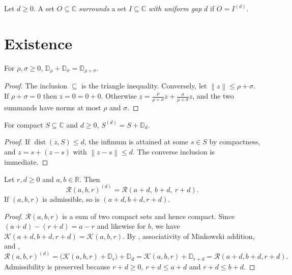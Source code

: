 \documentclass[a4paper,UKenglish,cleveref,autoref,thm-restate]{lipics-v2021}
\newcommand{\R}{\mathbb{R}}
\newcommand{\C}{\mathbb{C}}
\newcommand{\Disc}{\mathbb{D}}
\newcommand{\RR}{\mathcal{R}}
\newcommand{\Core}{\mathcal{K}}
\newcommand{\norm}[1]{\left\lVert #1 \right\rVert}
\DeclareMathOperator{\dist}{dist}
\begin{document}
\begin{definition}\label{def:gap}
Let $d \ge 0$. A set $O \subseteq \C$ \emph{surrounds} a set $I \subseteq \C$ \emph{with uniform
gap} $d$ if $O = I^{(d)}$.
\end{definition}

\section{Existence}\label{sec:existence}

\begin{lemma}\label{lem:disc}
For $\rho, \sigma \ge 0$, $\Disc_\rho + \Disc_\sigma = \Disc_{\rho + \sigma}$.
\end{lemma}

\begin{proof}
The inclusion $\subseteq$ is the triangle inequality. Conversely, let $\norm{z} \le \rho + \sigma$.
If $\rho + \sigma = 0$ then $z = 0 = 0 + 0$. Otherwise
$z = \frac{\rho}{\rho + \sigma} z + \frac{\sigma}{\rho + \sigma} z$, and the two summands have
norms at most $\rho$ and $\sigma$.
\end{proof}

\begin{lemma}\label{lem:compact}
For compact $S \subseteq \C$ and $d \ge 0$, $S^{(d)} = S + \Disc_d$.
\end{lemma}

\begin{proof}
If $\dist(z, S) \le d$, the infimum is attained at some $s \in S$ by compactness, and
$z = s + (z - s)$ with $\norm{z - s} \le d$. The converse inclusion is immediate.
\end{proof}

\begin{theorem}\label{thm:offset}
Let $r, d \ge 0$ and $a, b \in \R$. Then
\[
  \RR(a, b, r)^{(d)} = \RR(a + d,\ b + d,\ r + d).
\]
If $(a, b, r)$ is admissible, so is $(a + d, b + d, r + d)$.
\end{theorem}

\begin{proof}
$\RR(a, b, r)$ is a sum of two compact sets and hence compact. Since $(a + d) - (r + d) = a - r$
and likewise for $b$, we have $\Core(a + d, b + d, r + d) = \Core(a, b, r)$. By
, associativity of Minkowski addition, and ,
\[
  \RR(a, b, r)^{(d)}
  = \bigl(\Core(a, b, r) + \Disc_r\bigr) + \Disc_d
  = \Core(a, b, r) + \Disc_{r + d}
  = \RR(a + d, b + d, r + d).
\]
Admissibility is preserved because $r + d \ge 0$, $r + d \le a + d$ and $r + d \le b + d$.
\end{proof}
\end{document}
